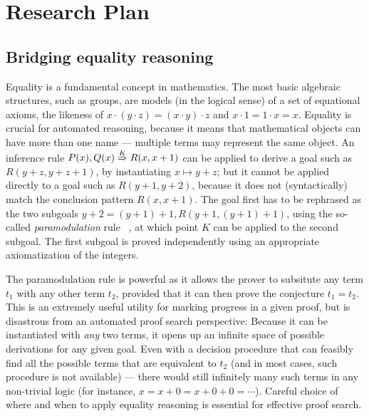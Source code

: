\section{Research Plan }


\subsection{Bridging equality reasoning}

Equality is a fundamental concept in mathematics.
The most basic algebraic structures, such as groups,
are models (in the logical sense) of a set of equational
axioms, the likeness of $x\cdot(y\cdot z) = (x\cdot y)\cdot z$ and $x\cdot 1 = 1\cdot x = x$.
Equality is crucial for automated reasoning, because it means that mathematical objects can have more than one name --- multiple terms may represent the same object.
An inference rule $\infruleshort{K}{P(x),Q(x)}{R(x, x+1)}$
can be applied to derive a goal such as $R(y+z, y+z+1)$,
by instantiating $x\mapsto y+z$;
but it cannot be applied directly to a goal such as
$R(y+1, y+2)$, because it does not (syntactically) match the conclusion pattern $R(x,x+1)$.
The goal first has to be rephrased as the two subgoals
$y + 2 = (y + 1) + 1, R(y+1, (y+1)+1)$, using the so-called \emph{paramodulation} rule%
~\cite{Book2001:Nieuwenhuis},
at which point $K$ can be applied to the second subgoal.
The first subgoal is proved independently using an appropriate axiomatization of the integers.

The paramodulation rule is powerful as it allows the prover to subsitute any term $t_1$ with any other term $t_2$, provided that it can then prove the conjecture $t_1 = t_2$.
This is an extremely useful utility for marking progress in a given proof, but is disastrous from an automated proof search perspective:
Because it can be instantiated with \emph{any} two terms, it opens up an infinite space of possible derivations for any given goal.
Even with a decision procedure that can feasibly find all the possible terms that are equivalent to $t_2$ (and in most cases, such procedure is not available) ---
there would still infinitely many such terms in any non-trivial logic (for instance, $x = x + 0 = x + 0 + 0 = \cdots$).
Careful choice of where and when to apply equality reasoning is essential for effective proof search.